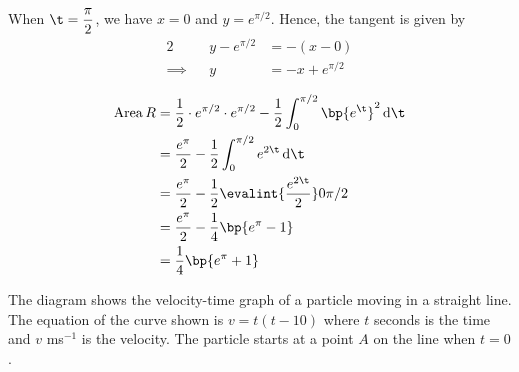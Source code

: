 \documentclass{echw}
\begin{document}
        When $\t = \dfrac\pi2$, we have $x = 0$ and $y = e^{\pi/2}$. Hence, the tangent is given by
        \begin{alignat*}{2}
            &&y - e^{\pi/2} &= -(x - 0)\\
            \implies&&y &= -x + e^{\pi/2}
        \end{alignat*}


        \begin{align*}
            \area R &= \dfrac12 \cdot e^{\pi/2} \cdot e^{\pi/2} - \dfrac12 \int_0^{\pi/2} \bp{e^\t}^2 \d \t\\
            &= \dfrac{e^\pi}2 - \dfrac12 \int_0^{\pi/2} e^{2\t} \d \t\\
            &= \dfrac{e^\pi}2 - \dfrac12 \evalint{\dfrac{e^{2\t}}2}0{\pi/2}\\
            &= \dfrac{e^\pi}2 - \dfrac14 \bp{e^\pi - 1}\\
            &= \dfrac14 \bp{e^\pi + 1}
        \end{align*}


    \problem{}
        \begin{center}
        \end{center}
        The diagram shows the velocity-time graph of a particle moving in a straight line. The equation of the curve shown is $v = t(t - 10)$ where $t$ seconds is the time and $v$ ms$^{-1}$ is the velocity. The particle starts at a point $A$ on the line when $t = 0$.
\end{document}
